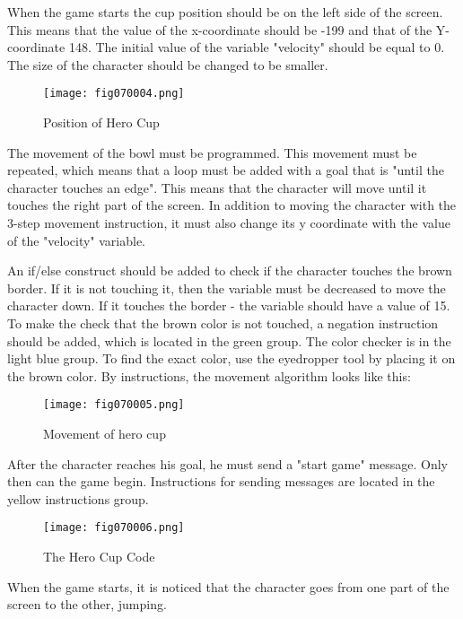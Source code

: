 When the game starts the cup position should be on the left side of the screen. This means that the value of the x-coordinate should be -199 and that of the Y-coordinate 148. The initial value of the variable "velocity" should be equal to 0. The size of the character should be changed to be smaller.

\begin{figure}[H]
   \centering
   \texttt{[image: fig070004.png]}
   \caption{Position of Hero Cup}
\label{fig070004}
\end{figure}

The movement of the bowl must be programmed. This movement must be repeated, which means that a loop must be added with a goal that is "until the character touches an edge". This means that the character will move until it touches the right part of the screen. In addition to moving the character with the 3-step movement instruction, it must also change its y coordinate with the value of the "velocity" variable.

An if/else construct should be added to check if the character touches the brown border. If it is not touching it, then the variable must be decreased to move the character down. If it touches the border - the variable should have a value of 15. To make the check that the brown color is not touched, a negation instruction should be added, which is located in the green group. The color checker is in the light blue group. To find the exact color, use the eyedropper tool by placing it on the brown color. By instructions, the movement algorithm looks like this:

\begin{figure}[H]
   \centering
   \texttt{[image: fig070005.png]}
   \caption{Movement of hero cup}
\label{fig070005}
\end{figure}

After the character reaches his goal, he must send a "start game" message. Only then can the game begin. Instructions for sending messages are located in the yellow instructions group.

\begin{figure}[H]
   \centering
   \texttt{[image: fig070006.png]}
   \caption{The Hero Cup Code}
\label{fig070006}
\end{figure}

When the game starts, it is noticed that the character goes from one part of the screen to the other, jumping.

